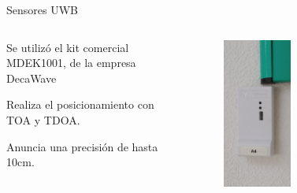 \documentclass{beamer}
\begin{document}
  \begin{frame}{Sensores UWB}
    \begin{columns}
      \begin{column}{0.5\textwidth}
        Se utilizó el kit comercial MDEK1001, de la empresa DecaWave

        \vspace{0.5cm}
        Realiza el posicionamiento con TOA y TDOA.

        \vspace{0.5cm}
        Anuncia una precisión de hasta 10cm.
      \end{column}
      \begin{column}{0.5\textwidth}  
        \begin{figure}[H]
          \centering
          \includegraphics[width=0.45\textwidth]{pic/sensor.jpg}
          \label{fig:robot}
      \end{figure}
      \end{column}
    \end{columns}
  \end{frame}
\end{document}
